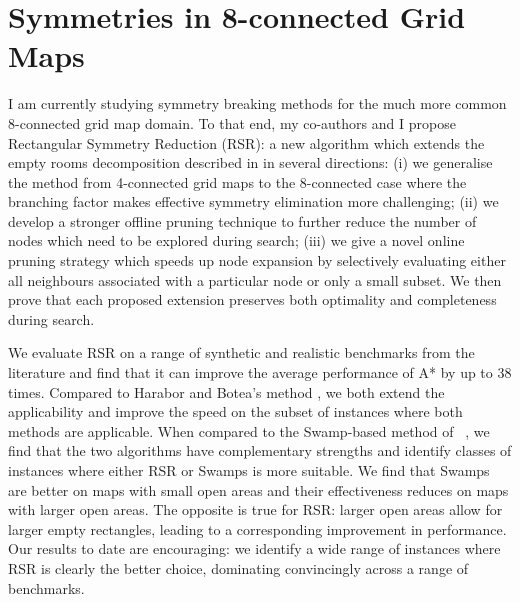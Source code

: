 \section{Symmetries in 8-connected Grid Maps}
I am currently studying symmetry breaking methods for the much more 
common 8-connected grid map domain.
To that end, my co-authors and I propose Rectangular Symmetry Reduction (RSR): 
a new algorithm which extends the empty rooms decomposition described in
\cite{harabor10} in several directions: (i) we generalise the method from
4-connected grid maps to the 8-connected case where the branching factor makes
effective symmetry elimination more challenging; (ii) we develop a stronger
offline pruning technique to further reduce the number of nodes which need to 
be explored during search; (iii) we give a novel online pruning strategy which
speeds up node expansion by selectively evaluating either all neighbours
associated with a particular node or only a small subset.  We then prove that 
each proposed extension preserves both optimality and completeness during
search.
\par
We evaluate RSR on a range of synthetic and realistic benchmarks from the
literature and find that it can improve the average performance of A* by up to
38 times.
Compared to Harabor and Botea's method , 
we both extend the applicability and improve the speed
on the subset of instances where both methods are applicable.
When compared to the Swamp-based method of 
\citeauthor{pochter10}~, we find that the two algorithms
have complementary strengths and identify classes of instances where
either RSR or Swamps is more suitable.
We find that Swamps are better on maps with
small open areas and their effectiveness reduces on maps with larger open areas.
The opposite is true for RSR: larger open areas allow for larger empty rectangles,
leading to a corresponding improvement in performance.
Our results to date are encouraging: we identify a wide range of instances where
RSR is clearly the better choice, dominating convincingly across a range of
benchmarks. 
